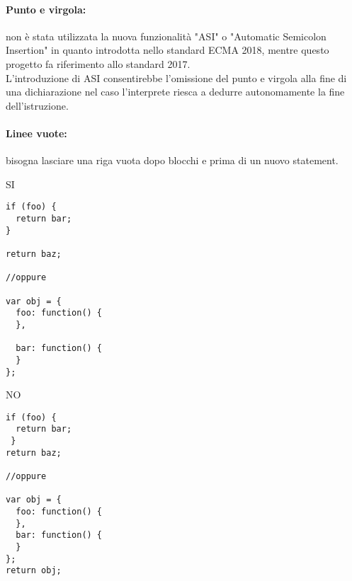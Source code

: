 \documentclass[../ProcessiPrimari.tex]{subfiles}
\begin{document}
\paragraph*{Punto e virgola: }
non è stata utilizzata la nuova funzionalità "ASI" o "Automatic Semicolon Insertion" in quanto introdotta nello standard ECMA 2018, mentre questo progetto fa riferimento allo standard 2017.\\
L'introduzione di ASI consentirebbe l'omissione del punto e virgola alla fine di una dichiarazione nel caso l'interprete riesca a dedurre autonomamente la fine dell'istruzione.

\paragraph*{Linee vuote: }
bisogna lasciare una riga vuota dopo blocchi e prima di un nuovo statement.

\begin{center}{
\begin{minipage}{6cm}
	{\begin{center}SI\end{center}}
	\begin{Verbatim}[frame=single]
if (foo) {
  return bar;
}

return baz;
	
//oppure 
	
var obj = {
  foo: function() {
  },
	
  bar: function() {
  }
};
\end{Verbatim}
\end{minipage}
\hfil
\begin{minipage}{6cm}
	{\begin{center}NO\end{center}}
	\begin{Verbatim}[frame=single]
if (foo) {
  return bar;
 }
return baz;
	
//oppure
	
var obj = {
  foo: function() {
  },
  bar: function() {
  }
};
return obj;
	
	\end{Verbatim}
\end{minipage}
}
\end{center}
\end{document}
